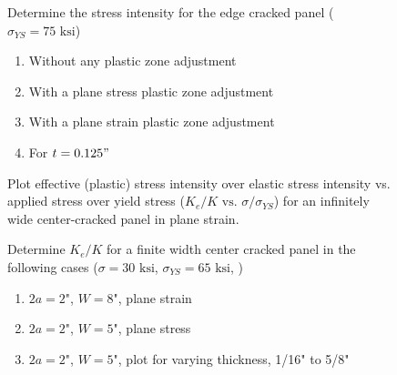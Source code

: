 \documentclass[12pt, oneside]{article}
\begin{document}
\begin{enumerate}

\begin{figure}[H]
	\item Determine the stress intensity for the edge cracked panel ($\sigma_{YS} = 75 \text{ ksi}$)
	\begin{enumerate}
		\item Without any plastic zone adjustment
		\item With a plane stress plastic zone adjustment
		\item With a plane strain plastic zone adjustment
		\item For $t = 0.125"$
	\end{enumerate}
		\centering
\end{figure}

\begin{figure}[H]
	\item Plot effective (plastic) stress intensity over elastic stress intensity vs. applied stress over yield stress ($K_e/K \text{ vs. } \sigma/\sigma_{YS}$) for an infinitely wide center-cracked panel in plane strain.
\end{figure}

\begin{figure}[H]
	\item Determine $K_e/K$ for a finite width center cracked panel in the following cases ($\sigma = 30 \text{ ksi}$, $\sigma_{YS} = 65 \text{ ksi}$, )
	\begin{enumerate}
		\item $2a = 2\text{"}$, $W = 8 \text{"}$, plane strain
		\item $2a = 2\text{"}$, $W = 5 \text{"}$, plane stress
		\item $2a = 2\text{"}$, $W = 5 \text{"}$, plot for varying thickness, 1/16" to 5/8"
	\end{enumerate}
\end{figure}


\end{enumerate}
\end{document}
